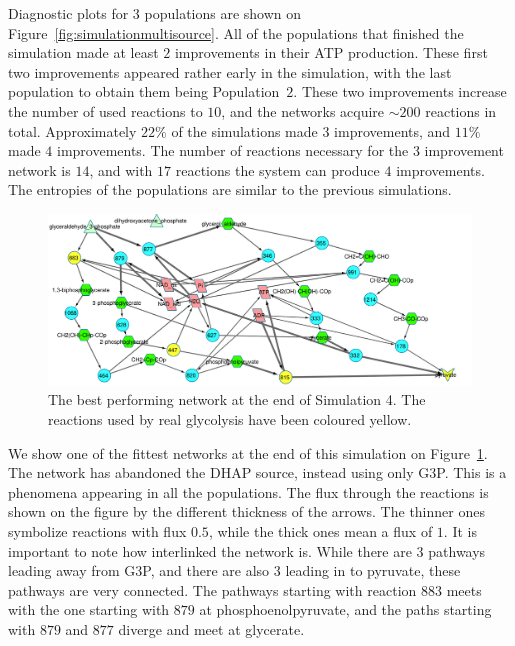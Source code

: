 \documentclass[a4paper,12pt]{article}
\begin{document}
Diagnostic plots for $3$ populations are shown on Figure~\ref{fig:simulationmultisource}. All of the populations that finished the simulation made at least $2$ improvements in their ATP production. These first two improvements appeared rather early in the simulation, with the last population to obtain them being Population~$2$. These two improvements increase the number of used reactions to $10$, and the networks acquire $\sim 200$ reactions in total.  Approximately $22\%$ of the simulations made $3$ improvements, and $11\%$ made $4$ improvements. The number of reactions necessary for the $3$ improvement network is $14$, and with $17$ reactions the system can produce $4$ improvements. The entropies of the populations are similar to the previous simulations. 



\begin{figure}[htpb]
	\centering
	\includegraphics[width=1\linewidth]{multisink_finalnet.pdf}
	\caption{The best performing network at the end of Simulation 4. The reactions used by real glycolysis have been coloured yellow. }
	\label{fig:multi}
\end{figure}

We show one of the fittest networks at the end of this simulation on Figure~\ref{fig:multi}. The network has abandoned the DHAP source, instead using only G3P. This is a phenomena appearing in all the populations. The flux through the reactions is shown on the figure by the different thickness of the arrows. The thinner ones symbolize reactions with flux $0.5$, while the thick ones mean a flux of $1$. It is important to note how interlinked the network is.  While there are 3 pathways leading away from G3P, and there are also $3$ leading in to pyruvate, these pathways are very connected. The pathways starting with reaction $883$ meets with the one starting with $879$ at phosphoenolpyruvate, and the paths starting with $879$ and $877$  diverge and meet at glycerate. 
\end{document}
